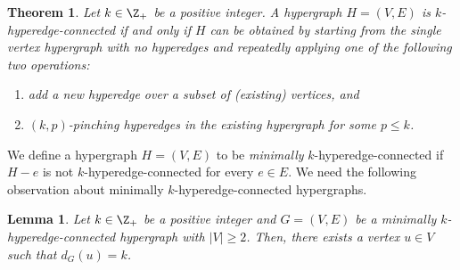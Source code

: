 \documentclass{article}
\def\Cref#1{<#1>}%
\newtheorem{lemma}{Lemma}[section]
\newtheorem{theorem}{Theorem}[section]
\begin{document}
\begin{theorem}\label{thm:k-EC-hypergraph-characterization}
    Let $k \in \Z_+$ be a positive integer. A hypergraph $H = (V, E)$ is $k$-hyperedge-connected if and only if $H$ can be obtained by starting from the single vertex hypergraph with no hyperedges and repeatedly applying one of the following two operations:
    \begin{enumerate}
        \item add a new hyperedge over a subset of (existing) vertices, and
        \item $(k, p)$-pinching hyperedges in the existing hypergraph for some $p \leq k$.
    \end{enumerate}
\end{theorem}
\fi
We define a hypergraph $H = (V, E)$ to be \emph{minimally} $k$-hyperedge-connected if $H-e$ is not $k$-hyperedge-connected for every $e\in E$. 
We need the following observation about minimally $k$-hyperedge-connected hypergraphs. %
\begin{lemma}\label{lem:minimally-k-EC-hypergraph-has-degree-k-vertex}
    Let $k \in \Z_+$ be a positive integer and $G = (V, E)$ be a minimally $k$-hyperedge-connected hypergraph with $|V| \geq 2$. Then, there exists a vertex $u \in V$ such that $d_G(u) = k$.
\end{lemma}
\end{document}
